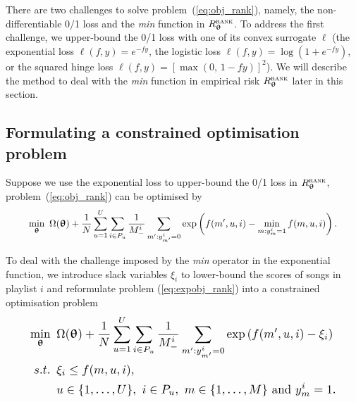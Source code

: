 There are two challenges to %
solve problem~(\ref{eq:obj_rank}),
namely, the non-differentiable 0/1 loss and the \emph{min} function in $R_{{\bm{\uptheta}}}^{\textsc{rank}}$.
To address the first challenge, we upper-bound %
the 0/1 loss with one of its convex surrogate $\ell$
(\eg the exponential loss $\ell(f, y) = e^{-fy}$, the logistic loss $\ell(f, y) = \log(1 + e^{-fy})$,
or the squared hinge loss $\ell(f, y) = [\max(0, \, 1 - fy)]^2$).
We will describe the method to deal with the \emph{min} function in empirical risk $R_{{\bm{\uptheta}}}^{\textsc{rank}}$ later in this section.




\subsection{Formulating a constrained optimisation problem}

Suppose we use the exponential loss %
to upper-bound the 0/1 loss in $R_{{\bm{\uptheta}}}^{\textsc{rank}}$,
problem~(\ref{eq:obj_rank}) can be optimised by
\begin{equation}
\label{eq:expobj_rank}
\resizebox{.908\linewidth}{!}{$\displaystyle
\min_{\upthetabm} \ \Omega(\upthetabm) + \frac{1}{N} \sum_{u=1}^U \sum_{i \in P_u} \frac{1}{M_-^i} 
                  \sum_{m': y_{m'}^i = 0} \exp \left(f(m', u, i) - \min_{m: y_m^i = 1} f(m, u, i) \right).
$}
\end{equation}

To deal with the challenge imposed by the \emph{min} operator in the exponential function, 
we introduce slack variables $\xi_i$ to lower-bound the scores of songs in playlist $i$ %
and 
reformulate problem (\ref{eq:expobj_rank}) into a constrained optimisation problem %
\begin{equation}
\label{eq:expobj_cons}
\resizebox{.9\linewidth}{!}{$\displaystyle
\begin{aligned}
\min_{\upthetabm} \ \, & 
\Omega(\upthetabm) + \frac{1}{N} \sum_{u=1}^U \sum_{i \in P_u} \frac{1}{M_-^i} \sum_{m': y_{m'}^i = 0} \exp \left( f(m', u, i) - \xi_i \right) \\
s.t. \ \, & 
\xi_i \le f(m, u, i), \\
& u \in \{1,\dots,U\}, \ i \in P_u, \ m \in \{1,\dots,M\} \ \text{and} \ y_m^i = 1.
\end{aligned}
$}
\end{equation}

